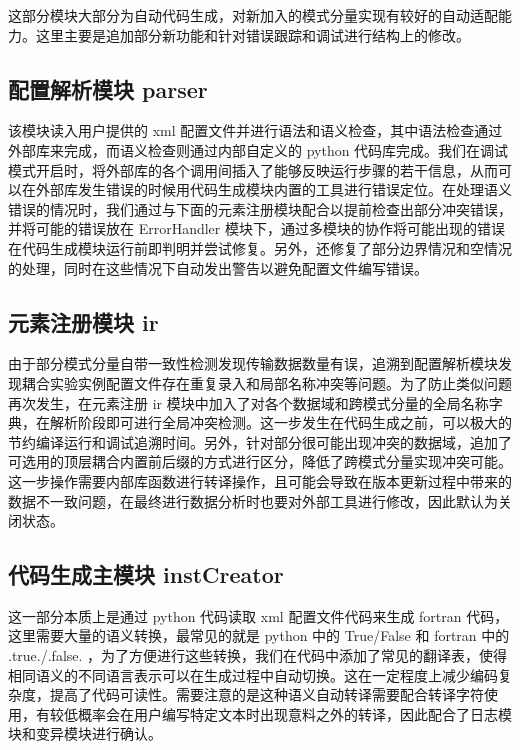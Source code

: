 这部分模块大部分为自动代码生成，对新加入的模式分量实现有较好的自动适配能力。这里主要是追加部分新功能和针对错误跟踪和调试进行结构上的修改。

\subsection{配置解析模块 parser}

该模块读入用户提供的 xml 配置文件并进行语法和语义检查，其中语法检查通过外部库来完成，而语义检查则通过内部自定义的 python 代码库完成。我们在调试模式开启时，将外部库的各个调用间插入了能够反映运行步骤的若干信息，从而可以在外部库发生错误的时候用代码生成模块内置的工具进行错误定位。在处理语义错误的情况时，我们通过与下面的元素注册模块配合以提前检查出部分冲突错误，并将可能的错误放在 ErrorHandler 模块下，通过多模块的协作将可能出现的错误在代码生成模块运行前即判明并尝试修复。另外，还修复了部分边界情况和空情况的处理，同时在这些情况下自动发出警告以避免配置文件编写错误。

\subsection{元素注册模块 ir}

由于部分模式分量自带一致性检测发现传输数据数量有误，追溯到配置解析模块发现耦合实验实例配置文件存在重复录入和局部名称冲突等问题。为了防止类似问题再次发生，在元素注册 ir 模块中加入了对各个数据域和跨模式分量的全局名称字典，在解析阶段即可进行全局冲突检测。这一步发生在代码生成之前，可以极大的节约编译运行和调试追溯时间。另外，针对部分很可能出现冲突的数据域，追加了可选用的顶层耦合内置前后缀的方式进行区分，降低了跨模式分量实现冲突可能。这一步操作需要内部库函数进行转译操作，且可能会导致在版本更新过程中带来的数据不一致问题，在最终进行数据分析时也要对外部工具进行修改，因此默认为关闭状态。

\subsection{代码生成主模块 instCreator}

这一部分本质上是通过 python 代码读取 xml 配置文件代码来生成 fortran 代码，这里需要大量的语义转换，最常见的就是 python 中的 True/False 和 fortran 中的 .true./.false. ，为了方便进行这些转换，我们在代码中添加了常见的翻译表，使得相同语义的不同语言表示可以在生成过程中自动切换。这在一定程度上减少编码复杂度，提高了代码可读性。需要注意的是这种语义自动转译需要配合转译字符使用，有较低概率会在用户编写特定文本时出现意料之外的转译，因此配合了日志模块和变异模块进行确认。

